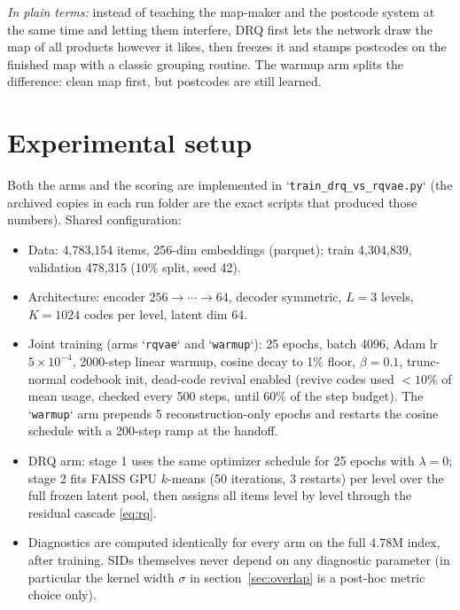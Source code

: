 \documentclass[11pt]{article}
\begin{document}
\emph{In plain terms:} instead of teaching the map-maker and the postcode
system at the same time and letting them interfere, DRQ first lets the network
draw the map of all products however it likes, then freezes it and stamps
postcodes on the finished map with a classic grouping routine. The warmup arm
splits the difference: clean map first, but postcodes are still learned.

\section{Experimental setup}

Both the arms and the scoring are implemented in
`\texttt{train\_drq\_vs\_rqvae.py}` (the archived copies in each run folder are
the exact scripts that produced those numbers). Shared configuration:

\begin{itemize}[nosep]
  \item Data: 4{,}783{,}154 items, 256-dim embeddings (parquet);
        train 4{,}304{,}839, validation 478{,}315 (10\% split, seed 42).
  \item Architecture: encoder $256 \to \cdots \to 64$, decoder symmetric,
        $L=3$ levels, $K=1024$ codes per level, latent dim 64.
  \item Joint training (arms `\texttt{rqvae}` and `\texttt{warmup}`): 25 epochs,
        batch 4096, Adam lr $5\times10^{-4}$, 2000-step linear warmup, cosine
        decay to 1\% floor, $\beta = 0.1$, trunc-normal codebook init,
        dead-code revival enabled (revive codes used $<10\%$ of mean usage,
        checked every 500 steps, until 60\% of the step budget).
        The `\texttt{warmup}` arm prepends 5 reconstruction-only epochs and
        restarts the cosine schedule with a 200-step ramp at the handoff.
  \item DRQ arm: stage 1 uses the same optimizer schedule for 25 epochs with
        $\lambda = 0$; stage 2 fits FAISS GPU $k$-means (50 iterations,
        3 restarts) per level over the full frozen latent pool, then assigns
        all items level by level through the residual cascade
        \eqref{eq:rq}.
  \item Diagnostics are computed identically for every arm on the full 4.78M
        index, after training. SIDs themselves never depend on any diagnostic
        parameter (in particular the kernel width $\sigma$ in
        section~\ref{sec:overlap} is a post-hoc metric choice only).
\end{itemize}
\end{document}
